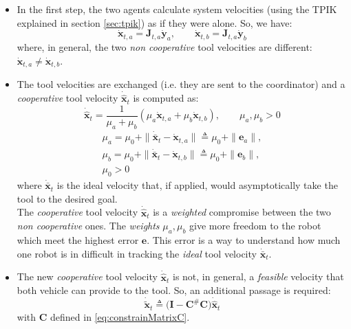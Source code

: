 \begin{itemize}
	\item In the first step, the two agents calculate system velocities (using the TPIK explained in  section \ref{sec:tpik}) as if they were alone. So, we have:
	\begin{equation}
		\dot{\boldsymbol{x}}_{t,a} = \boldsymbol{J}_{t,a} \dot{\boldsymbol{y}}_{a} , \qquad 
		\dot{\boldsymbol{x}}_{t,b} = \boldsymbol{J}_{t,a} \dot{\boldsymbol{y}}_{b}	
	\end{equation}
	where, in general, the two \textit{non cooperative} tool velocities are different:\\ \mbox{$\dot{\boldsymbol{x}}_{t,a} \neq \dot{\boldsymbol{x}}_{t,b}$.}
	
	\item The tool velocities are exchanged (i.e. they are sent to the coordinator) and a \textit{cooperative} tool velocity $\dot{\hat{\boldsymbol{x}}}_t$ is computed as:
	\begin{equation}\label{eq:weightsum}
		\dot{\hat{\boldsymbol{x}}}_t = \dfrac{1}{\mu_a + \mu_b} (\mu_a \dot{\boldsymbol{x}}_{t,a}  + \mu_b \dot{\boldsymbol{x}}_{t,b}), \qquad
		\mu_a , \mu_b > 0	
	\end{equation}
    \begin{equation}
		\begin{gathered}
			\mu_a = \mu_0 + \| \dot{\bar{\boldsymbol{x}}}_t - \dot{\boldsymbol{x}}_{t,a} \| \triangleq \mu_0 + \| \boldsymbol{e}_a \|, \\
			\mu_b = \mu_0 + \| \dot{\bar{\boldsymbol{x}}}_t - \dot{\boldsymbol{x}}_{t,b} \| \triangleq \mu_0 + \| \boldsymbol{e}_b \|, \\
			\mu_0 > 0
	    \end{gathered}
	\end{equation}
	where $\dot{\bar{\boldsymbol{x}}}_t$ is the ideal velocity that, if applied, would asymptotically take the tool to the desired goal.\\
	The \textit{cooperative} tool velocity $\dot{\hat{\boldsymbol{x}}}_t$  is a \textit{weighted} compromise between the two \textit{non cooperative} ones. The \textit{weights} $\mu_a, \mu_b$ give more freedom to the robot which meet the highest error $\boldsymbol{e}$. This error is a way to understand how much one robot is in difficult in tracking the \textit{ideal} tool velocity $\dot{\bar{\boldsymbol{x}}}_t$.
	
	\item The new \textit{cooperative} tool velocity $\dot{\hat{\boldsymbol{x}}}_t$ is not, in general, a \textit{feasible} velocity that both vehicle can provide to the tool. So, an additional passage is required:
	\begin{equation}
		\dot{\tilde{\boldsymbol{x}}}_t \triangleq \big( \boldsymbol{I} - \boldsymbol{C}^\# \boldsymbol{C} \big) \dot{\hat{\boldsymbol{x}}}_t
	\end{equation}
	with $\boldsymbol{C}$ defined in \eqref{eq:constrainMatrixC}.
	

\end{itemize}
